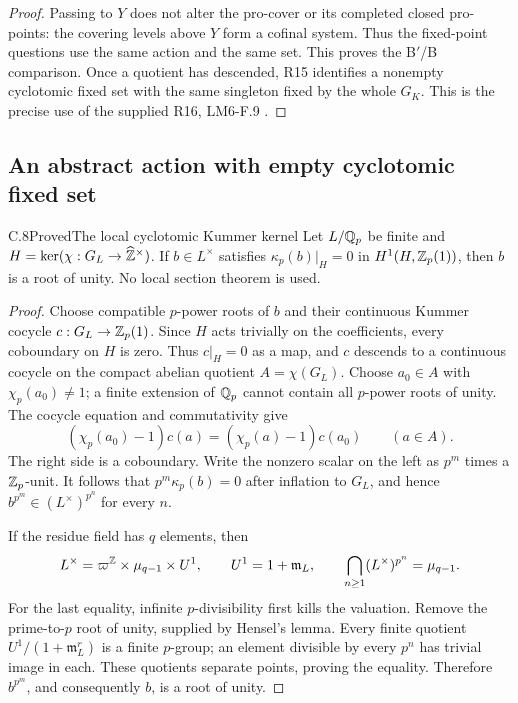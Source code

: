 \begin{proof}
Passing to $Y$ does not alter the pro-cover or its completed
closed pro-points: the covering levels above $Y$ form a cofinal
system. Thus the fixed-point questions use the same action and
the same set. This proves the B$'$/B comparison. Once a quotient
has descended, R15 identifies a nonempty cyclotomic fixed set
with the same singleton fixed by the whole $G_K$. This is the
precise use of the supplied R16, LM6-F.9
\cite[F.9]{AgentLM6}.
\end{proof}

\subsection{An abstract action with empty cyclotomic fixed set}

\begin{statement}{C.8}{Proved}{The local cyclotomic Kummer kernel}
Let $L/\mathbb Q_p$ be finite and
$H=\ker(\chi:G_L\to\widehat{\mathbb Z}^{\times})$. If
$b\in L^\times$ satisfies
$\kappa_p(b)|_H=0$ in $H^1(H,\mathbb Z_p(1))$, then $b$ is a root
of unity. No local section theorem is used.
\end{statement}
\begin{proof}
Choose compatible $p$-power roots of $b$ and their continuous
Kummer cocycle $c:G_L\to\mathbb Z_p(1)$. Since $H$ acts trivially on
the coefficients, every coboundary on $H$ is zero. Thus $c|_H=0$
as a map, and $c$ descends to a continuous cocycle on the compact
abelian quotient $A=\chi(G_L)$.
Choose $a_0\in A$ with $\chi_p(a_0)\ne1$; a finite extension
of $\mathbb Q_p$ cannot contain all $p$-power roots of unity.
The cocycle equation and commutativity give
\[
 (\chi_p(a_0)-1)c(a)=(\chi_p(a)-1)c(a_0)\qquad(a\in A).
\]
The right side is a coboundary. Write the nonzero scalar on the
left as $p^m$ times a $\mathbb Z_p$-unit. It follows that
$p^m\kappa_p(b)=0$ after inflation to $G_L$, and hence
$b^{p^m}\in(L^\times)^{p^n}$ for every $n$.

If the residue field has $q$ elements, then
\[
 L^\times=\varpi^{\mathbb Z}\times\mu_{q-1}\times U^1,
 \qquad U^1=1+\mathfrak m_L,
 \qquad \bigcap_{n\ge1}(L^\times)^{p^n}=\mu_{q-1}.
\]
For the last equality, infinite $p$-divisibility first kills the
valuation. Remove the prime-to-$p$ root of unity, supplied by
Hensel's lemma. Every finite quotient
$U^1/(1+\mathfrak m_L^r)$ is a finite $p$-group; an element
divisible by every $p^n$ has trivial image in each. These
quotients separate points, proving the equality. Therefore
$b^{p^m}$, and consequently $b$, is a root of unity.
\end{proof}

